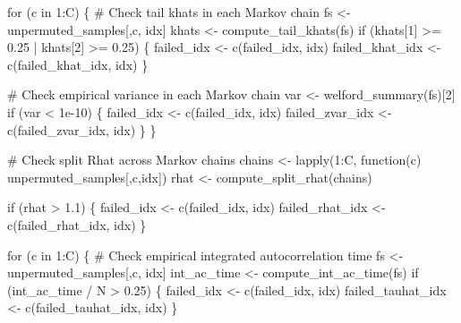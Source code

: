 \documentclass[
  letterpaper,
  DIV=11,
  numbers=noendperiod]{scrartcl}
\newenvironment{Shaded}{\begin{snugshade}}{\end{snugshade}}
\newcommand{\CommentTok}[1]{\textcolor[rgb]{0.37,0.37,0.37}{#1}}
\newcommand{\ControlFlowTok}[1]{\textcolor[rgb]{0.00,0.23,0.31}{#1}}
\newcommand{\DecValTok}[1]{\textcolor[rgb]{0.68,0.00,0.00}{#1}}
\newcommand{\FloatTok}[1]{\textcolor[rgb]{0.68,0.00,0.00}{#1}}
\newcommand{\FunctionTok}[1]{\textcolor[rgb]{0.28,0.35,0.67}{#1}}
\newcommand{\NormalTok}[1]{\textcolor[rgb]{0.00,0.23,0.31}{#1}}
\newcommand{\OtherTok}[1]{\textcolor[rgb]{0.00,0.23,0.31}{#1}}
\newcommand{\SpecialCharTok}[1]{\textcolor[rgb]{0.37,0.37,0.37}{#1}}
\begin{document}
\begin{Shaded}
\begin{Highlighting}[]
    \ControlFlowTok{for}\NormalTok{ (c }\ControlFlowTok{in} \DecValTok{1}\SpecialCharTok{:}\NormalTok{C) \{}
      \CommentTok{\# Check tail khats in each Markov chain}
\NormalTok{      fs }\OtherTok{\textless{}{-}}\NormalTok{ unpermuted\_samples[,c, idx]}
\NormalTok{      khats }\OtherTok{\textless{}{-}} \FunctionTok{compute\_tail\_khats}\NormalTok{(fs)}
      \ControlFlowTok{if}\NormalTok{ (khats[}\DecValTok{1}\NormalTok{] }\SpecialCharTok{\textgreater{}=} \FloatTok{0.25} \SpecialCharTok{|}\NormalTok{ khats[}\DecValTok{2}\NormalTok{] }\SpecialCharTok{\textgreater{}=} \FloatTok{0.25}\NormalTok{) \{}
\NormalTok{        failed\_idx }\OtherTok{\textless{}{-}} \FunctionTok{c}\NormalTok{(failed\_idx, idx)}
\NormalTok{        failed\_khat\_idx }\OtherTok{\textless{}{-}} \FunctionTok{c}\NormalTok{(failed\_khat\_idx, idx)}
\NormalTok{      \}}
    
      \CommentTok{\# Check empirical variance in each Markov chain}
\NormalTok{      var }\OtherTok{\textless{}{-}} \FunctionTok{welford\_summary}\NormalTok{(fs)[}\DecValTok{2}\NormalTok{]}
      \ControlFlowTok{if}\NormalTok{ (var }\SpecialCharTok{\textless{}} \FloatTok{1e{-}10}\NormalTok{) \{}
\NormalTok{        failed\_idx }\OtherTok{\textless{}{-}} \FunctionTok{c}\NormalTok{(failed\_idx, idx)}
\NormalTok{        failed\_zvar\_idx }\OtherTok{\textless{}{-}} \FunctionTok{c}\NormalTok{(failed\_zvar\_idx, idx)}
\NormalTok{      \}}
\NormalTok{    \}}
  
    \CommentTok{\# Check split Rhat across Markov chains}
\NormalTok{    chains }\OtherTok{\textless{}{-}} \FunctionTok{lapply}\NormalTok{(}\DecValTok{1}\SpecialCharTok{:}\NormalTok{C, }\ControlFlowTok{function}\NormalTok{(c) unpermuted\_samples[,c,idx])}
\NormalTok{    rhat }\OtherTok{\textless{}{-}} \FunctionTok{compute\_split\_rhat}\NormalTok{(chains)}

    \ControlFlowTok{if}\NormalTok{ (rhat }\SpecialCharTok{\textgreater{}} \FloatTok{1.1}\NormalTok{) \{}
\NormalTok{      failed\_idx }\OtherTok{\textless{}{-}} \FunctionTok{c}\NormalTok{(failed\_idx, idx)}
\NormalTok{      failed\_rhat\_idx }\OtherTok{\textless{}{-}} \FunctionTok{c}\NormalTok{(failed\_rhat\_idx, idx)}
\NormalTok{    \}}

    \ControlFlowTok{for}\NormalTok{ (c }\ControlFlowTok{in} \DecValTok{1}\SpecialCharTok{:}\NormalTok{C) \{}
      \CommentTok{\# Check empirical integrated autocorrelation time}
\NormalTok{      fs }\OtherTok{\textless{}{-}}\NormalTok{ unpermuted\_samples[,c, idx]}
\NormalTok{      int\_ac\_time }\OtherTok{\textless{}{-}} \FunctionTok{compute\_int\_ac\_time}\NormalTok{(fs)}
      \ControlFlowTok{if}\NormalTok{ (int\_ac\_time }\SpecialCharTok{/}\NormalTok{ N }\SpecialCharTok{\textgreater{}} \FloatTok{0.25}\NormalTok{) \{}
\NormalTok{        failed\_idx }\OtherTok{\textless{}{-}} \FunctionTok{c}\NormalTok{(failed\_idx, idx)}
\NormalTok{        failed\_tauhat\_idx }\OtherTok{\textless{}{-}} \FunctionTok{c}\NormalTok{(failed\_tauhat\_idx, idx)}
\NormalTok{      \}}


\end{Highlighting}
\end{Shaded}
\end{document}
